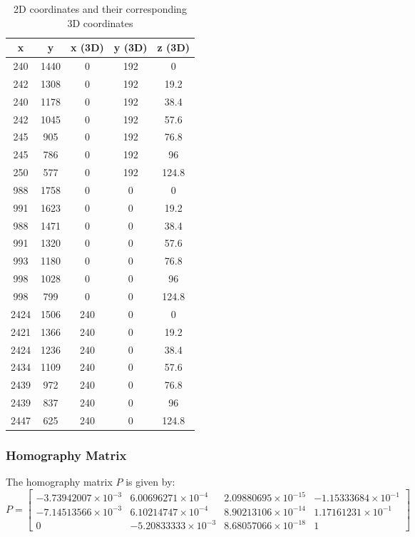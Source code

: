 \documentclass{article}
\begin{document}
\begin{table}[h!]
    \centering
    \begin{tabular}{|c|c|c|c|c|}
    \hline
    \textbf{x} & \textbf{y} & \textbf{x} (3D) & \textbf{y} (3D) & \textbf{z} (3D) \\
    \hline
    240 & 1440 & 0 & 192 & 0 \\
    242 & 1308 & 0 & 192 & 19.2 \\
    240 & 1178 & 0 & 192 & 38.4 \\
    242 & 1045 & 0 & 192 & 57.6 \\
    245 & 905 & 0 & 192 & 76.8 \\
    245 & 786 & 0 & 192 & 96 \\
    250 & 577 & 0 & 192 & 124.8 \\
    988 & 1758 & 0 & 0 & 0 \\
    991 & 1623 & 0 & 0 & 19.2 \\
    988 & 1471 & 0 & 0 & 38.4 \\
    991 & 1320 & 0 & 0 & 57.6 \\
    993 & 1180 & 0 & 0 & 76.8 \\
    998 & 1028 & 0 & 0 & 96 \\
    998 & 799 & 0 & 0 & 124.8 \\
    2424 & 1506 & 240 & 0 & 0 \\
    2421 & 1366 & 240 & 0 & 19.2 \\
    2424 & 1236 & 240 & 0 & 38.4 \\
    2434 & 1109 & 240 & 0 & 57.6 \\
    2439 & 972 & 240 & 0 & 76.8 \\
    2439 & 837 & 240 & 0 & 96 \\
    2447 & 625 & 240 & 0 & 124.8 \\
    \hline
    \end{tabular}
    \caption{2D coordinates and their corresponding 3D coordinates}
    \end{table}

\subsubsection*{Homography Matrix}

The homography matrix \( P \) is given by:
\[
P = \begin{bmatrix}
-3.73942007 \times 10^{-3} & 6.00696271 \times 10^{-4} & 2.09880695 \times 10^{-15} & -1.15333684 \times 10^{-1} \\
-7.14513566 \times 10^{-3} & 6.10214747 \times 10^{-4} & 8.90213106 \times 10^{-14} & 1.17161231 \times 10^{-1} \\
0 & -5.20833333 \times 10^{-3} & 8.68057066 \times 10^{-18} & 1
\end{bmatrix}
\]
\end{document}
